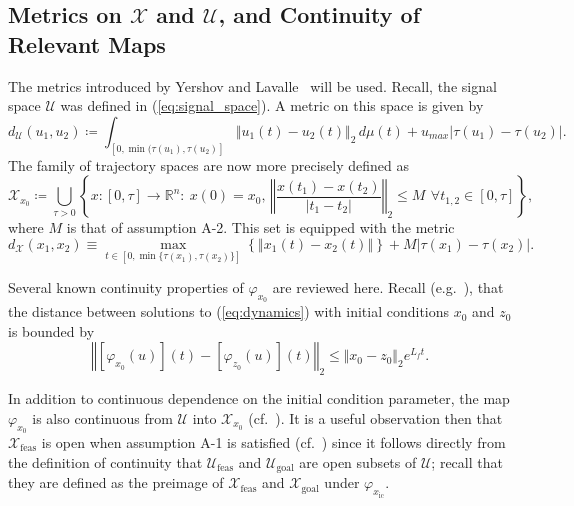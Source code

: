 \documentclass{llncs}
\begin{document}
\subsection{Metrics on $\mathcal{X}$ and $\mathcal{U}$, and Continuity of Relevant
Maps \label{sec:topology}}

The metrics introduced by Yershov and Lavalle~\cite{yershov2011sufficient} will be used.  
%
Recall, the signal space $\mathcal{U}$ was defined in (\ref{eq:signal_space}).
A metric on this space is given by 
\begin{equation}
d_{\mathcal{U}}(u_{1},u_{2})\coloneqq\int_{[0,\min(\tau(u_{1}),\tau(u_{2})]}\Vert u_{1}(t)-u_{2}(t)\Vert_{2} \, d\mu(t)+u_{max}|\tau(u_{1})-\tau(u_{2})|.\label{eq:du}
\end{equation}
The family of trajectory spaces are now more precisely defined as 
\begin{equation}
\mathcal{X}_{x_0} \coloneqq \bigcup_{\tau>0}\left\{ x:[0,\tau]\rightarrow \mathbb{R}^n: \: x(0)=x_{0}, \, \left\Vert \frac{x(t_{1})-x(t_{2})}{|t_{1}-t_{2}|}\right\Vert _{2}\leq M\:\, \forall t_{1,2}\in[0,\tau]\right\} ,\label{eq:traj_space}
\end{equation}
where $M$ is that of assumption A-2. This set is equipped with the metric 
\begin{equation}
d_{\mathcal{X}}(x_{1},x_{2})\equiv\max_{t\in\left[0,\min\{\tau(x_{1}),\tau(x_{2})\}\right]}\left\{ \left\Vert x_{1}(t)-x_{2}(t)\right\Vert \right\} +M|\tau(x_{1})-\tau(x_{2})|.\label{eq:traj_metric}
\end{equation}

Several known continuity properties of $\varphi_{x_0}$ are reviewed here. Recall (e.g.~\cite[pg. 95]{khalil1996nonlinear}), that the distance between solutions to (\ref{eq:dynamics}) with initial conditions $x_0$ and $z_0$ is bounded by
\begin{equation}\label{lem:cont_ic}
\left\Vert [\varphi_{x_{0}}(u)](t)-[\varphi_{z_{0}}(u)](t)\right\Vert _{2}\leq\Vert x_{0}-z_{0}\Vert_{2}e^{L_{f}t}.
\end{equation}  

In addition to continuous dependence on the initial condition parameter, the map $\varphi_{x_{0}}$ is also continuous from $\mathcal{U}$ into $\mathcal{X}_{x_{0}}$ (cf.~\cite[Theorem 1]{yershov2011sufficient}). It is a  useful observation then that $\mathcal{X}_\mathrm{feas}$ is open when assumption A-1 is satisfied (cf.~\cite[Theorem 2]{yershov2011sufficient}) since it follows directly from the definition of continuity that $\mathcal{U}_\mathrm{feas}$ and $\mathcal{U}_\mathrm{goal}$ are open subsets of $\mathcal{U}$; recall that they are defined as the preimage of $\mathcal{X}_\mathrm{feas}$ and $\mathcal{X}_\mathrm{goal}$ under $\varphi_{x_\mathrm{ic}}$.
\end{document}
